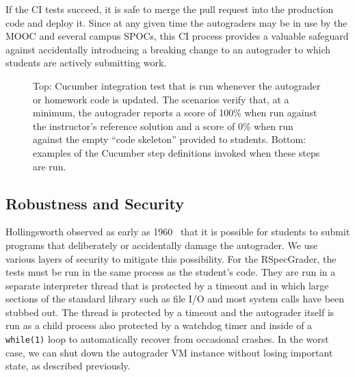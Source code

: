 If the CI tests succeed, it is safe to merge the pull request into the
production code and deploy it.  Since at any given time the autograders
may be in use by the MOOC and several campus SPOCs,
this CI process provides a valuable safeguard
against accidentally introducing a breaking change to an autograder to
which students are actively submitting work.


\begin{figure}
  \centering
  \caption{\label{fig:rag-ci}%
  Top: Cucumber integration test that is run whenever the autograder or
  homework code is updated.  The scenarios verify that, at a minimum,
  the autograder reports a score of 100\% when run against the
  instructor's reference solution and a score of 0\% when run against
  the empty ``code skeleton'' provided to students.  
  Bottom: examples of the Cucumber step definitions invoked when these
  steps are run.
}
\end{figure}


\subsection{Robustness and Security}

Hollingsworth observed as early as 1960~\cite{hollingsworth60} that it
is possible for students 
to submit programs that deliberately or accidentally damage the autograder. 
We use various layers of security to mitigate this possibility.
For the RSpecGrader, the tests must be run in the same
process as the student's code.  They are run in a separate interpreter
thread that is protected by a timeout and in which large sections of the
standard library such as file I/O and most system calls have been
stubbed out.  The thread is protected by a timeout and the autograder
itself is run as a child process also protected by a watchdog timer and
inside of a \texttt{while(1)} loop to automatically recover from
occasional crashes.  In the worst case, we can shut down the autograder
VM instance without losing important state, as described previously.
 

